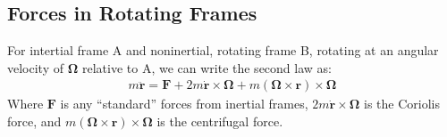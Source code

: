 \documentclass[letterpaper,10pt,english]{jupyterBook}
\begin{document}
\subsection{Forces in Rotating Frames}
\label{\detokenize{content/1_mechanics/frames:forces-in-rotating-frames}}
\sphinxAtStartPar
For intertial frame A and non\sphinxhyphen{}inertial, rotating frame B, rotating at an angular velocity of \(\mathbf{\Omega}\) relative to A, we can write the second law as:
\begin{equation*}
\begin{split}
m\ddot{\mathbf{r}} = \mathbf{F} + 2m\dot{\mathbf{r}}\times \mathbf{\Omega} + m (\mathbf{\Omega}\times \mathbf{r}) \times \mathbf{\Omega}
\end{split}
\end{equation*}
\sphinxAtStartPar
Where \(\mathbf{F}\) is any “standard” forces from inertial frames, \(2m\dot{\mathbf{r}}\times \mathbf{\Omega}\) is the Coriolis force, and \(m (\mathbf{\Omega}\times \mathbf{r}) \times \mathbf{\Omega}\) is the centrifugal force.

\sphinxstepscope
\end{document}
